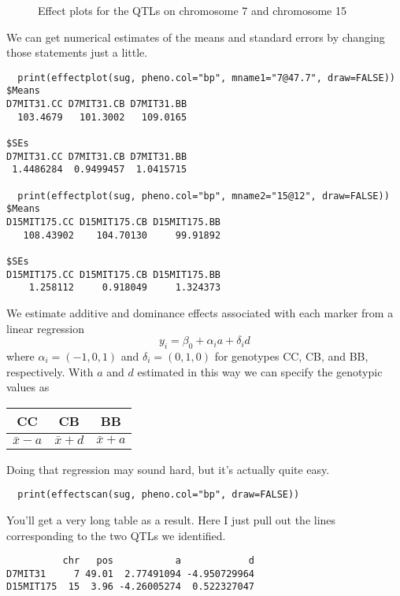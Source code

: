 \begin{figure}
\caption{Effect plots for the QTLs on chromosome 7 and chromosome
  15}\label{fig:qtl-rqtl-effects} 
\end{figure}

We can get numerical estimates of the means and standard errors by
changing those statements just a little. 
\begin{verbatim}
  print(effectplot(sug, pheno.col="bp", mname1="7@47.7", draw=FALSE))
$Means
D7MIT31.CC D7MIT31.CB D7MIT31.BB 
  103.4679   101.3002   109.0165 

$SEs
D7MIT31.CC D7MIT31.CB D7MIT31.BB 
 1.4486284  0.9499457  1.0415715 

  print(effectplot(sug, pheno.col="bp", mname2="15@12", draw=FALSE))
$Means
D15MIT175.CC D15MIT175.CB D15MIT175.BB 
   108.43902    104.70130     99.91892 

$SEs
D15MIT175.CC D15MIT175.CB D15MIT175.BB 
    1.258112     0.918049     1.324373 
\end{verbatim}

We estimate additive and dominance effects associated with each marker
from a linear regression
\[
y_i = \beta_0 + \alpha_ia + \delta_id
\]
where $\alpha_i = (-1,0,1)$ and $\delta_i = (0, 1, 0)$ for genotypes
CC, CB, and BB, respectively. With $a$ and $d$ estimated in this way
we can specify the genotypic values as

\begin{center}
\begin{tabular}{ccc}
\hline\hline
CC & CB & BB \\
\hline
$\bar x - a$  & $\bar x + d$  & $\bar x + a$ \\
\hline
\end{tabular}
\end{center}

\noindent Doing that regression may sound hard, but it's actually quite
easy.
\begin{verbatim}
  print(effectscan(sug, pheno.col="bp", draw=FALSE))
\end{verbatim}
You'll get a very long table as a result. Here I just pull out the
lines corresponding to the two QTLs we identified.
\begin{verbatim}
          chr   pos           a            d
D7MIT31     7 49.01  2.77491094 -4.950729964
D15MIT175  15  3.96 -4.26005274  0.522327047
\end{verbatim}

